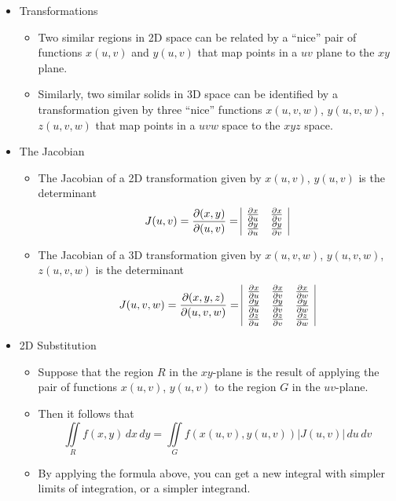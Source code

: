 \documentclass[12pt]{article}
\theoremstyle{plain}
\theoremstyle{definition}
\theoremstyle{remark}
\begin{document}
	\begin{itemize}
	
	\item Transformations
	
		\begin{itemize}
		\item Two similar regions in 2D space can be related by a ``nice'' pair of functions $x(u,v)$ and $y(u,v)$ that map points in a $uv$ plane to the $xy$ plane.
		\item Similarly, two similar solids in 3D space can be identified by a transformation given by three ``nice'' functions $x(u,v,w)$, $y(u,v,w)$, $z(u,v,w)$ that map points in a $uvw$ space to the $xyz$ space.
		\end{itemize}
	
	\item The Jacobian
	
		\begin{itemize}
		\item The Jacobian of a 2D transformation given by $x(u,v)$, $y(u,v)$ is the determinant
\[
J(u,v) = \frac{\partial (x,y)}{\partial (u,v)} =
\begin{array}{|c c|}
\frac{\partial x}{\partial u} & \frac{\partial x}{\partial v} \\
\frac{\partial y}{\partial u} & \frac{\partial y}{\partial v} \\
\end{array}
\]
		\item The Jacobian of a 3D transformation given by $x(u,v,w)$, $y(u,v,w)$, $z(u,v,w)$ is the determinant
\[
J(u,v,w) = \frac{\partial (x,y,z)}{\partial (u,v,w)} =
\begin{array}{|c c c|}
\frac{\partial x}{\partial u} & \frac{\partial x}{\partial v} & \frac{\partial x}{\partial w} \\
\frac{\partial y}{\partial u} & \frac{\partial y}{\partial v} & \frac{\partial y}{\partial w} \\
\frac{\partial z}{\partial u} & \frac{\partial z}{\partial v} & \frac{\partial z}{\partial w} \\
\end{array}
\]
		\end{itemize}
		
	\item 2D Substitution
	
		\begin{itemize}
		\item Suppose that the region $R$ in the $xy$-plane is the result of applying the pair of functions $x(u,v)$, $y(u,v)$ to the region $G$ in the $uv$-plane.
		\item Then it follows that \[\iint\limits_R f(x,y)\,dx\,dy = \iint\limits_G f(x(u,v),y(u,v))|J(u,v)|\,du\,dv\]
		\item By applying the formula above, you can get a new integral with simpler limits of integration, or a simpler integrand.
		\end{itemize}
		

\end{itemize}
\end{document}
